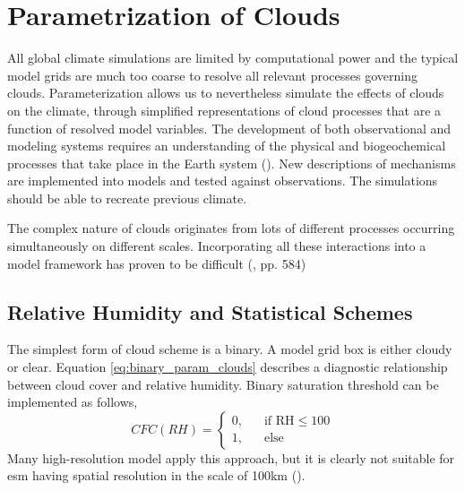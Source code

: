 \section{Parametrization of Clouds} \label{sec:param_clouds}
All global climate simulations are limited by computational power and the typical model grids are much too coarse to resolve all relevant processes governing clouds. Parameterization allows us to nevertheless simulate the effects of clouds on the climate, through simplified representations of cloud processes that are a function of resolved model variables. The development of both observational and modeling systems requires an understanding of the physical and biogeochemical processes that take place in the Earth system (\cite{Simmons2016Observation2016-2025}). New descriptions of mechanisms are implemented into models and tested against observations. The simulations should be able to recreate previous climate. 

The complex nature of clouds originates from lots of different processes occurring simultaneously on different scales. Incorporating all these interactions into a model framework has proven to be difficult (\cite{IPCC_CH7_clouds}, pp. 584)

\subsection{Relative Humidity and Statistical Schemes}
The simplest form of cloud scheme is a binary. A model grid box is either cloudy or clear. Equation \eqref{eq:binary_param_clouds} describes a diagnostic relationship between cloud cover and relative humidity. Binary saturation threshold can be implemented as follows,
\begin{equation} \label{eq:binary_param_clouds}
    CFC\left(RH\right) = 
     \begin{cases}
       \text{0,} &\quad\text{if RH}\le100\\
       \text{1,} &\quad\text{else}
     \end{cases}
\end{equation}
Many high-resolution model apply this approach, but it is clearly not suitable for \acrshort{esm} having spatial resolution in the scale of 100km (\cite{Tomkins2005}).

